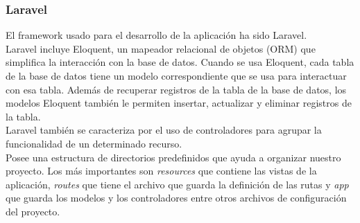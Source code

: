 \subsubsection{Laravel}
El framework usado para el desarrollo de la aplicación ha sido Laravel.\\
Laravel incluye Eloquent, un mapeador relacional de objetos (ORM) que simplifica la interacción con la base de datos. Cuando se usa Eloquent, cada tabla de la base de datos tiene un modelo correspondiente que se usa para interactuar con esa tabla. Además de recuperar registros de la tabla de la base de datos, los modelos Eloquent también le permiten insertar, actualizar y eliminar registros de la tabla.\cite{Laravel:modelos}\\
Laravel también se caracteriza por el uso de controladores para agrupar la funcionalidad de un determinado recurso.\cite{Laravel:controladores}\\
Posee una estructura de directorios predefinidos que ayuda a organizar nuestro proyecto. Los más importantes son \textit{resources} que contiene las vistas de la aplicación, \textit{routes} que tiene el archivo que guarda la definición de las rutas y \textit{app} que guarda los modelos y los controladores entre otros archivos de configuración del proyecto.\\

